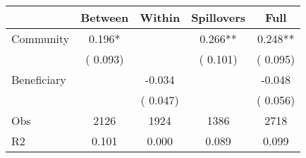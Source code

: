 
\begin{tabular}{l*{4}{c}}\hline&\multicolumn{1}{c}{Between}&\multicolumn{1}{c}{Within}&\multicolumn{1}{c}{Spillovers}&\multicolumn{1}{c}{Full}\\ \hline
 Community             &              0.196*      &                                               &        0.266** &         0.248**                            \\ 
                               &        (       0.093)           &                                       &       (       0.101)     &      (       0.095)                                           \\ 
 Beneficiary   &                                               &       -0.034    &                                &            -0.048                            \\ 
                               &                                               & (       0.047)                  &                                        &      (       0.056)                                           \\ 
\hline                                                                                                                                                                                                                                            
 Obs                   &               2126               &       1924                       &       1386                &              2718                                               \\ 
 R2                    &                      0.101              &              0.000                      &              0.089               &                     0.099                                              \\ 
\hline \end{tabular}                                                                                                                                                                                                              